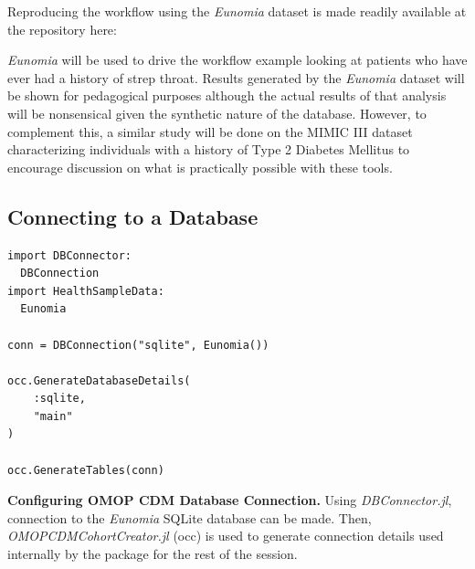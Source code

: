 \documentclass{juliacon}
\begin{document}
Reproducing the workflow using the \textit{Eunomia} dataset is made readily available at the repository here: \cite{schuemieEunomia2023}


\textit{Eunomia} will be used to drive the workflow example looking at patients who have ever had a history of strep throat.
Results generated by the \textit{Eunomia} dataset will be shown for pedagogical purposes although the actual results of that analysis will be nonsensical given the synthetic nature of the database.
However, to complement this, a similar study will be done on the MIMIC III dataset characterizing individuals with a history of Type 2 Diabetes Mellitus to encourage discussion on what is practically possible with these tools.

\subsection{Connecting to a Database}

\begin{listing}[!ht]
\begin{verbatim}
import DBConnector: 
  DBConnection
import HealthSampleData: 
  Eunomia

conn = DBConnection("sqlite", Eunomia())

occ.GenerateDatabaseDetails(
    :sqlite,
    "main"
)

occ.GenerateTables(conn)
\end{verbatim}
\caption{\textbf{Configuring OMOP CDM Database Connection.} Using \textit{DBConnector.jl}, connection to the \textit{Eunomia} SQLite database can be made. Then, \textit{OMOPCDMCohortCreator.jl} (occ) is used to generate connection details used internally by the package for the rest of the session.}
\label{listing:connection}
\end{listing}
\end{document}
